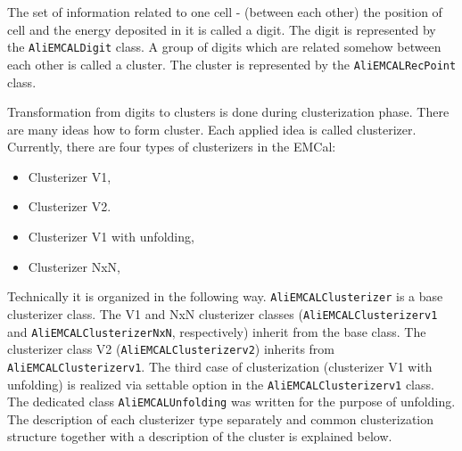 
The set of information related to one cell - (between each other) the position of cell and the energy deposited in it is called a digit. The digit is represented by the \texttt{AliEMCALDigit} class. A group of digits which are related somehow between each other is called a cluster. The cluster is represented by the \texttt{AliEMCALRecPoint} class.

Transformation from digits to clusters is done during clusterization phase. There are many ideas how to form cluster. Each applied idea is called clusterizer. Currently, there are four types of clusterizers in the EMCal:


\begin{itemize}
\item Clusterizer V1,
\item Clusterizer V2.
\item Clusterizer V1 with unfolding,
\item Clusterizer NxN,

\end{itemize}


Technically it is organized in the following way. \texttt{AliEMCALClusterizer} is a base clusterizer class. The V1 and NxN clusterizer classes (\texttt{AliEMCALClusterizerv1} and \texttt{AliEMCALClusterizerNxN}, respectively) inherit from the base class. The clusterizer class V2 (\texttt{AliEMCALClusterizerv2}) inherits from \texttt{AliEMCALClusterizerv1}. The third case of clusterization (clusterizer V1 with unfolding) is realized via settable option in the \texttt{AliEMCALClusterizerv1} class. The dedicated class \texttt{AliEMCALUnfolding} was written for the purpose of unfolding. The description of each clusterizer type separately and common clusterization structure together with a description of the cluster is explained below.
